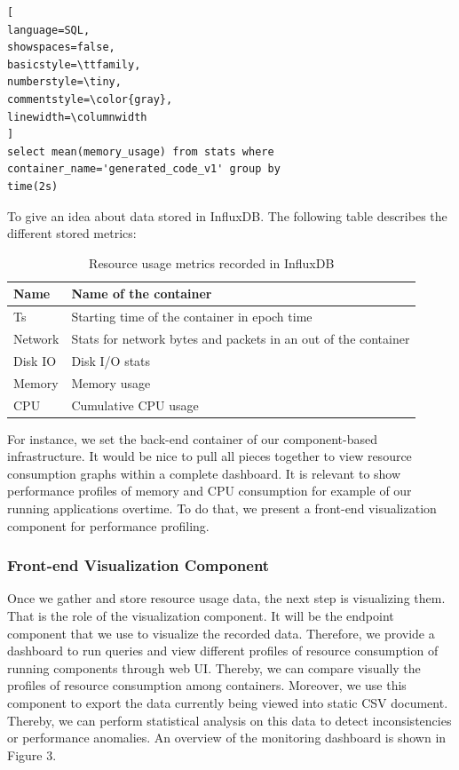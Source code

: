 \begin{lstlisting}[
language=SQL,
showspaces=false,
basicstyle=\ttfamily,
numberstyle=\tiny,
commentstyle=\color{gray},
linewidth=\columnwidth
]
select mean(memory_usage) from stats where 
container_name='generated_code_v1' group by 
time(2s)
\end{lstlisting}
To give an idea about data stored in InfluxDB. The following table describes the different stored metrics:
 \begin{table}[h]
 	\begin{center}
 		\begin{tabular}{|p{1cm}|p{6.9cm}|}
 			\hline
 			 Name & Name of the container \\
 			\hline
 			 Ts & Starting time of the container in epoch time \\
 			\hline
 			 Network &  Stats for network bytes and packets in an out of the container \\
 			\hline
 			 Disk IO &  Disk I/O stats \\
 			\hline
 			 Memory &  Memory usage \\
 			
 			\hline
 		   	CPU &  Cumulative CPU usage \\
 			\hline
 			
 		\end{tabular}
 		
 	\end{center}
 	\caption {Resource usage metrics recorded in InfluxDB}
 \end{table}

For instance, we set the back-end container of our component-based infrastructure. It would be nice to pull all pieces together to view resource consumption graphs within a complete dashboard. It is relevant to show performance profiles of memory and CPU consumption for example of our running applications overtime. To do that, we present a front-end visualization component for performance profiling. 

\subsubsection{Front-end Visualization Component}
Once we gather and store resource usage data, the next step is visualizing them. That is the role of the visualization component. It will be the endpoint component that we use to visualize the recorded data. Therefore, we provide a dashboard to run queries and view different profiles of resource consumption of running components through web UI. Thereby, we can compare visually the profiles of resource consumption among containers. Moreover, we use this component to export the data currently being viewed into static CSV document. Thereby, we can perform statistical analysis on this data to detect inconsistencies or performance anomalies. An overview of the monitoring dashboard is shown in Figure 3.

